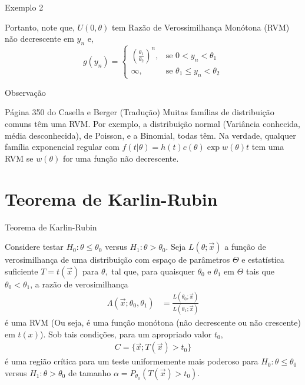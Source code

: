 \documentclass[12pt]{beamer}
\begin{document}
\begin{frame}{Exemplo 2}
\begin{block}{}
\justifying
Portanto, note que, $U(0, \theta)$ tem Razão de Verossimilhança Monótona (RVM) não decrescente em $y_n$ e,
\[
g(y_n) = \begin{cases} 
\left(\frac{\theta_1}{\theta_2}\right)^n, & \text{se } 0 < y_n < \theta_1 \\
\infty, & \text{se } \theta_1 \leq y_n < \theta_2
\end{cases}
\]
\end{block}
\end{frame}

\begin{frame}{Observação}
\begin{block}{Página 350 do Casella e Berger (Tradução)}
\justifying
Muitas famílias de distribuição comuns têm uma RVM. Por exemplo, a distribuição normal (Variância conhecida, média desconhecida), de Poisson, e a Binomial, todas têm. Na verdade, qualquer família exponencial regular com $f(t|\theta)=h(t)c(\theta)\exp{w(\theta)t}$ tem uma RVM se $w(\theta)$ for uma função não decrescente.
\end{block}
\end{frame}

\section{Teorema de Karlin-Rubin}
\begin{frame}{Teorema de Karlin-Rubin}
\vspace{-0.2cm}
\begin{block}{}
\justifying
Considere testar $H_{0}: \theta \leq \theta_0$ versus $H_{1}: \theta > \theta_0.$
Seja $L(\theta; \Vec{x})$ a função de verosimilhança de uma distribuição com espaço de parâmetros $\Theta$ e estatística suficiente $T = t(\Vec{x})$ para $\theta,$ tal que, para quaisquer $\theta_0$ e $\theta_1$ em $\Theta$ tais que $\theta_0 < \theta_1$, a razão de verosimilhança
\begin{align*}
\Lambda(\Vec{x}; \theta_0, \theta_1) &= \frac{L(\theta_0; \Vec{x})}{L(\theta_1; \Vec{x})}
\end{align*}
é uma RVM (Ou seja, é uma função monótona (não decrescente ou não crescente) em $t(x)$). Sob tais condições, para um apropriado valor $t_{0},$ 
\begin{align*}
    C=\{\Vec{x};T(\Vec{x})> t_{0}\} 
\end{align*}
é uma região crítica para um teste uniformemente mais poderoso para $H_{0}: \theta \leq \theta_0$ versus $H_{1}: \theta > \theta_0$ de tamanho $\alpha=P_{\theta_{0}}(T(\Vec{x})> t_{0})$.
\end{block}
\end{frame}
\end{document}
